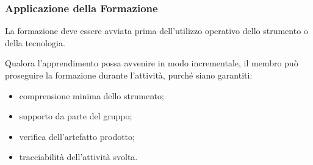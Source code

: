 
\subsubsection{Applicazione della Formazione}

La formazione deve essere avviata prima dell'utilizzo operativo dello strumento o
della tecnologia.

Qualora l'apprendimento possa avvenire in modo incrementale, il membro può
proseguire la formazione durante l'attività, purché siano garantiti:

\begin{itemize}
    \item comprensione minima dello strumento;
    \item supporto da parte del gruppo;
    \item verifica dell'artefatto prodotto;
    \item tracciabilità dell'attività svolta.
\end{itemize}
